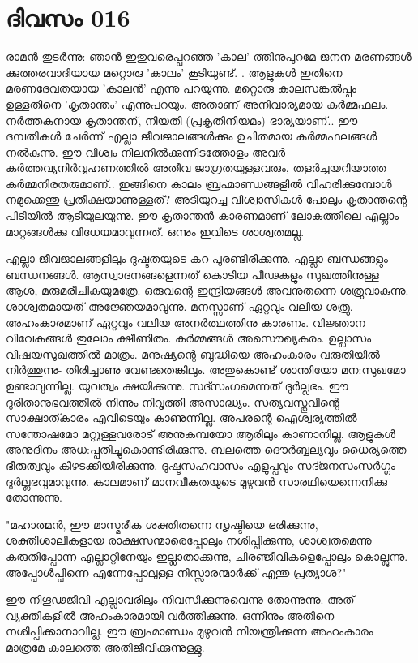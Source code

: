  
\section{ദിവസം 016}


രാമന്‍ തുടര്‍ന്നു: ഞാന്‍ ഇതുവരെപ്പറഞ്ഞ 'കാല' ത്തിനുപുറമേ ജനന മരണങ്ങള്‍ ക്കുത്തരവാദിയായ മറ്റൊരു 'കാലം' കൂടിയുണ്ട്‌. . ആളുകള്‍ ഇതിനെ മരണദേവതയായ 'കാലന്‍' എന്നു പറയുന്നു. മറ്റൊരു കാലസങ്കല്‍പ്പം ഉള്ളതിനെ 'കൃതാന്തം' എന്നുപറയും. അതാണ്‌ അനിവാര്യമായ കര്‍മ്മഫലം. നര്‍ത്തകനായ കൃതാന്തന്‌, നിയതി (പ്രകൃതിനിയമം) ഭാര്യയാണ്‌..  ഈ ദമ്പതികള്‍ ചേര്‍ന്ന് എല്ലാ ജീവജാലങ്ങള്‍ക്കും ഉചിതമായ കര്‍മ്മഫലങ്ങള്‍ നല്‍കുന്നു. ഈ വിശ്വം നിലനില്‍ക്കുന്നിടത്തോളം അവര്‍ കര്‍ത്തവ്യനിര്‍വ്വഹണത്തില്‍ അതീവ ജാഗ്രതയുള്ളവരും, തളര്‍ച്ചയറിയാത്ത കര്‍മ്മനിരതരുമാണ്‌..  ഇങ്ങിനെ കാലം ബ്രഹ്മാണ്ഡങ്ങളില്‍ വിഹരിക്കുമ്പോള്‍ നമുക്കെന്തു പ്രതീക്ഷയാണുള്ളത്‌? അടിയുറച്ച വിശ്വാസികള്‍ പോലും കൃതാന്തന്റെ പിടിയില്‍ ആടിയുലയുന്നു. ഈ  കൃതാന്തന്‍ കാരണമാണ്‌ ലോകത്തിലെ എല്ലാം മാറ്റങ്ങള്‍ക്കു വിധേയമാവുന്നത്‌. ഒന്നും ഇവിടെ ശാശ്വതമല്ല.

എല്ലാ ജീവജാലങ്ങളിലും ദുഷ്ടതയുടെ കറ പുരണ്ടിരിക്കുന്നു. എല്ലാ ബന്ധങ്ങളും ബന്ധനങ്ങള്‍.  ആസ്വാദനങ്ങളെന്നത്‌ കൊടിയ പീഢകളും സുഖത്തിനുള്ള ആശ, മരുമരീചികയുമത്രേ. ഒരുവന്റെ ഇന്ദ്രിയങ്ങള്‍ അവനുതന്നെ ശത്രുവാകുന്നു. ശാശ്വതമായത്‌ അജ്ഞേയമാവുന്നു. മനസ്സാണ്‌ ഏറ്റവും വലിയ ശത്രു. അഹംകാരമാണ്‌ ഏറ്റവും വലിയ അനര്‍ത്ഥത്തിനു കാരണം. വിജ്ഞാന വിവേകങ്ങള്‍ തുലോം ക്ഷീണിതം. കര്‍മ്മങ്ങള്‍ അസൌഖ്യകരം. ഉല്ലാസം വിഷയസുഖത്തില്‍ മാത്രം. മനുഷ്യന്റെ ബുദ്ധിയെ അഹംകാരം വരുതിയില്‍ നിര്‍ത്തുന്നു- തിരിച്ചാണു വേണ്ടതെങ്കിലും. അതുകൊണ്ട്‌ ശാന്തിയോ മന:സുഖമോ ഉണ്ടാവുന്നില്ല. യുവത്വം ക്ഷയിക്കുന്നു. സദ്സംഗമെന്നത്‌ ദുര്‍ല്ലഭം. ഈ ദുരിതാനുഭവത്തില്‍ നിന്നും നിവൃത്തി അസാദ്ധ്യം. സത്യവസ്തുവിന്റെ സാക്ഷാത്കാരം എവിടെയും കാണുന്നില്ല. അപരന്റെ ഐശ്വര്യത്തില്‍ സന്തോഷമോ മറ്റുള്ളവരോട്‌ അനുകമ്പയോ ആരിലും കാണാനില്ല. ആളുകള്‍ അനുദിനം അധ:പ്പതിച്ചുകൊണ്ടിരിക്കുന്നു. ബലത്തെ ദൌര്‍ബ്ബല്യവും ധൈര്യത്തെ ഭീരുത്വവും കീഴടക്കിയിരിക്കുന്നു. ദുഷ്ടസഹവാസം എളുപ്പവും സദ്ജനസംസര്‍ഗ്ഗം ദുര്‍ല്ലഭവുമാവുന്നു. കാലമാണ്‌ മാനവീകതയുടെ മുഴുവന്‍ സാരഥിയെന്നെനിക്കു തോന്നുന്നു. 

"മഹാത്മന്‍, ഈ മാസ്മരീക ശക്തിതന്നെ സൃഷ്ടിയെ ഭരിക്കുന്നു, ശക്തിശാലികളായ രാക്ഷസന്മാരെപ്പോലും നശിപ്പിക്കുന്നു, ശാശ്വതമെന്നു കരുതിപ്പോന്ന എല്ലാറ്റിനേയും ഇല്ലാതാക്കുന്നു, ചിരഞ്ജീവികളെപ്പോലും കൊല്ലുന്നു. അപ്പോള്‍പ്പിന്നെ എന്നേപ്പോലുള്ള നിസ്സാരന്മാര്‍ക്ക്‌ എന്തു പ്രത്യാശ?"

ഈ നിഗൂഢജീവി എല്ലാവരിലും നിവസിക്കുന്നുവെന്നു തോന്നുന്നു. അത്‌ വ്യക്തികളില്‍ അഹംകാരമായി വര്‍ത്തിക്കുന്നു. ഒന്നിനും അതിനെ നശിപ്പിക്കാനാവില്ല. ഈ ബ്രഹ്മാണ്ഡം മുഴുവന്‍ നിയന്ത്രിക്കുന്ന അഹംകാരം മാത്രമേ കാലത്തെ അതിജീവിക്കുന്നുള്ളു. 
